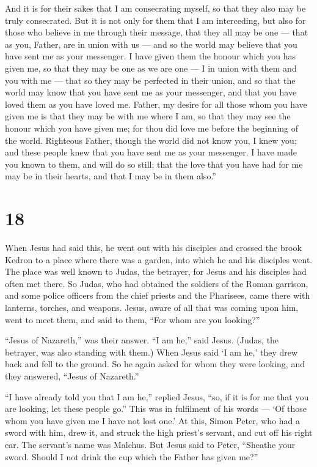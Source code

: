  And it is for their sakes that I am consecrating myself,
so that they also may be truly consecrated.  But it is not
only for them that I am interceding, but also for those who believe in
me through their message,  that they all may be one ---
that as you, Father, are in union with us --- and so the world may
believe that you have sent me as your messenger.  I have
given them the honour which you has given me, so that they may be one as
we are one ---  I in union with them and you with me ---
that so they may be perfected in their union, and so that the world may
know that you have sent me as your messenger, and that you have loved
them as you have loved me.  Father, my desire for all those
whom you have given me is that they may be with me where I am, so that
they may see the honour which you have given me; for thou did love me
before the beginning of the world.  Righteous Father,
though the world did not know you, I knew you; and these people knew
that you have sent me as your messenger.  I have made you
known to them, and will do so still; that the love that you have had for
me may be in their hearts, and that I may be in them also.''

\hypertarget{section-17}{%
\section{18}\label{section-17}}

 When Jesus had said this, he went out with his disciples
and crossed the brook Kedron to a place where there was a garden, into
which he and his disciples went.  The place was well known
to Judas, the betrayer, for Jesus and his disciples had often met there.
 So Judas, who had obtained the soldiers of the Roman
garrison, and some police officers from the chief priests and the
Pharisees, came there with lanterns, torches, and weapons. 
Jesus, aware of all that was coming upon him, went to meet them, and
said to them, ``For whom are you looking?''

 ``Jesus of Nazareth,'' was their answer. ``I am he,'' said
Jesus. (Judas, the betrayer, was also standing with them.) 
When Jesus said `I am he,' they drew back and fell to the ground.
 So he again asked for whom they were looking, and they
answered, ``Jesus of Nazareth.''

 ``I have already told you that I am he,'' replied Jesus,
``so, if it is for me that you are looking, let these people go.''
 This was in fulfilment of his words --- `Of those whom you
have given me I have not lost one.'  At this, Simon Peter,
who had a sword with him, drew it, and struck the high priest's servant,
and cut off his right ear. The servant's name was Malchus. 
But Jesus said to Peter, ``Sheathe your sword. Should I not drink the
cup which the Father has given me?''

